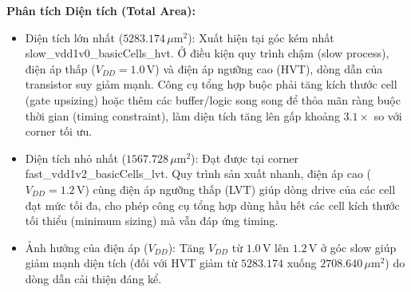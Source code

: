 \documentclass[12pt,a4paper,oneside]{book}
\begin{document}
\begin{table}[H]
\centering
{}
\caption{Tổng hợp thông số Diện tích và Công suất của khối VTC Calculation qua các process corners.}
\end{table}

\textbf{Phân tích Diện tích (Total Area):}
\begin{itemize}
    \item Diện tích lớn nhất ($5283.174\,\mu\text{m}^2$): Xuất hiện tại góc kém nhất slow\_vdd1v0\_basicCells\_hvt. Ở điều kiện quy trình chậm (slow process), điện áp thấp ($V_{DD} = 1.0\,\text{V}$) và điện áp ngưỡng cao (HVT), dòng dẫn của transistor suy giảm mạnh. Công cụ tổng hợp buộc phải tăng kích thước cell (gate upsizing) hoặc thêm các buffer/logic song song để thỏa mãn ràng buộc thời gian (timing constraint), làm diện tích tăng lên gấp khoảng $3.1\times$ so với corner tối ưu.
    \item Diện tích nhỏ nhất ($1567.728\,\mu\text{m}^2$): Đạt được tại corner fast\_vdd1v2\_basicCells\_lvt. Quy trình sản xuất nhanh, điện áp cao ($V_{DD} = 1.2\,\text{V}$) cùng điện áp ngưỡng thấp (LVT) giúp dòng drive của các cell đạt mức tối đa, cho phép công cụ tổng hợp dùng hầu hết các cell kích thước tối thiểu (minimum sizing) mà vẫn đáp ứng timing.
    \item Ảnh hưởng của điện áp ($V_{DD}$): Tăng $V_{DD}$ từ $1.0\,\text{V}$ lên $1.2\,\text{V}$ ở góc slow giúp giảm mạnh diện tích (đối với HVT giảm từ $5283.174$ xuống $2708.640\,\mu\text{m}^2$) do dòng dẫn cải thiện đáng kể.
\end{itemize}
\end{document}
